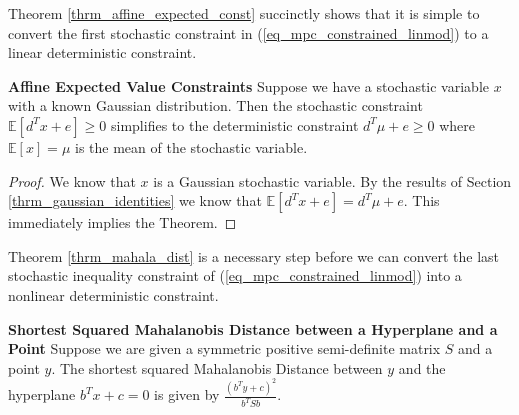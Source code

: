 Theorem \ref{thrm_affine_expected_const} succinctly shows that it is simple to convert the first stochastic constraint in (\ref{eq_mpc_constrained_linmod}) to a linear deterministic constraint.
\begin{thrm}
\textbf{Affine Expected Value Constraints} Suppose we have a stochastic variable $x$ with a known Gaussian distribution. Then the stochastic constraint $\mathbb{E}[d^Tx + e] \geq 0$ simplifies to the deterministic constraint $d^T\mu + e \geq 0$ where $\mathbb{E}[x]= \mu$ is the mean of the stochastic variable.
\label{thrm_affine_expected_const}
\end{thrm}
\begin{proof}
We know that $x$ is a Gaussian stochastic variable. By the results of Section \ref{thrm_gaussian_identities} we know that $\mathbb{E}[d^Tx + e] =d^T\mu + e$. This immediately implies the Theorem.
\end{proof}
Theorem \ref{thrm_mahala_dist} is a necessary step before we can convert the last stochastic inequality constraint of (\ref{eq_mpc_constrained_linmod}) into a nonlinear deterministic constraint.
\begin{thrm}
\textbf{Shortest Squared Mahalanobis Distance between a Hyperplane and a Point} Suppose we are given a symmetric positive semi-definite matrix $S$ and a point $y$. The shortest squared Mahalanobis Distance between $y$ and the hyperplane $b^Tx+c=0$ is given by $\frac{(b^Ty+c)^2}{b^TSb}$.
\label{thrm_mahala_dist}
\end{thrm}
